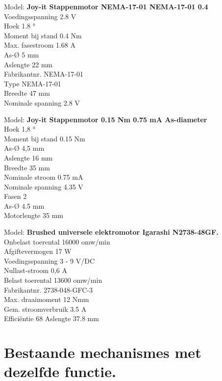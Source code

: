 Model: \textbf{Joy-it Stappenmotor NEMA-17-01 NEMA-17-01 0.4} \\
Voedingsspanning	2.8 V \\
Hoek	1.8 °\\
Moment bij stand	0.4 Nm \\
Max. fasestroom	1.68 A \\
As-Ø	5 mm \\
Aslengte	22 mm \\
Fabrikantnr.	NEMA-17-01 \\
Type	NEMA-17-01 \\
Breedte	47 mm \\
Nominale spanning	2.8 V \\
\vspace{\baselineskip}

Model: \textbf{Joy-it Stappenmotor 0.15 Nm 0.75 mA As-diameter} \\
Hoek	1,8 ° \\
Moment bij stand	0.15 Nm \\
As-Ø	4,5 mm \\
Aslengte	16 mm \\
Breedte	35 mm \\
Nominale stroom	0.75 mA \\
Nominale spanning	4.35 V \\
Fasen	2 \\
As-Ø	4.5 mm \\
Motorlengte	35 mm \\
\vspace{\baselineskip}

Model: \textbf{Brushed universele elektromotor Igarashi N2738-48GF.} \\
Onbelast toerental	16000 omw/min \\
Afgiftevermogen	17 W \\
Voedingsspanning	3 - 9 V/DC \\
Nullast-stroom	0,6 A \\
Belast toerental	13600 omw/min \\
Fabrikantnr.	2738-048-GFC-3 \\
Max. draaimoment	12 Nmm \\
Gem. stroomverbruik	3.5 A \\
Efficiëntie	68 %
Aslengte	37.8 mm \\
\vspace{\baselineskip}

\section{Bestaande mechanismes met dezelfde functie.}
\vspace{\baselineskip}

